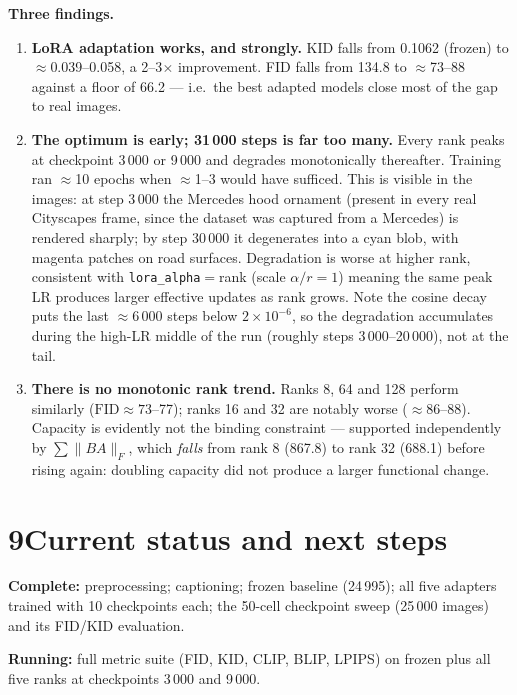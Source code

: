 \documentclass[11pt,a4paper]{article}
\begin{document}
\textbf{Three findings.}

\begin{enumerate}
\item \textbf{LoRA adaptation works, and strongly.} KID falls from 0.1062
(frozen) to $\approx$0.039--0.058, a 2--3$\times$ improvement. FID falls from
134.8 to $\approx$73--88 against a floor of 66.2 --- i.e.\ the best adapted
models close most of the gap to real images.

\item \textbf{The optimum is early; 31\,000 steps is far too many.} Every rank
peaks at checkpoint 3\,000 or 9\,000 and degrades monotonically thereafter.
Training ran $\approx$10 epochs when $\approx$1--3 would have sufficed. This is
visible in the images: at step 3\,000 the Mercedes hood ornament (present in
every real Cityscapes frame, since the dataset was captured from a Mercedes) is
rendered sharply; by step 30\,000 it degenerates into a cyan blob, with magenta
patches on road surfaces. Degradation is worse at higher rank, consistent with
\texttt{lora\_alpha}$=$rank (scale $\alpha/r = 1$) meaning the same peak LR
produces larger effective updates as rank grows. Note the cosine decay puts the
last $\approx$6\,000 steps below $2\times10^{-6}$, so the degradation accumulates
during the high-LR middle of the run (roughly steps 3\,000--20\,000), not at the
tail.

\item \textbf{There is no monotonic rank trend.} Ranks 8, 64 and 128 perform
similarly ($\text{FID}\approx73$--77); ranks 16 and 32 are notably worse
($\approx86$--88). Capacity is evidently not the binding constraint --- supported
independently by $\sum\|BA\|_F$, which \emph{falls} from rank 8 (867.8) to rank 32
(688.1) before rising again: doubling capacity did not produce a larger
functional change.
\end{enumerate}

\section*{9\quad Current status and next steps}

\textbf{Complete:} preprocessing; captioning; frozen baseline (24\,995);
all five adapters trained with 10 checkpoints each; the 50-cell checkpoint sweep
(25\,000 images) and its FID/KID evaluation.

\textbf{Running:} full metric suite (FID, KID, CLIP, BLIP, LPIPS) on frozen plus
all five ranks at checkpoints 3\,000 and 9\,000.
\end{document}
